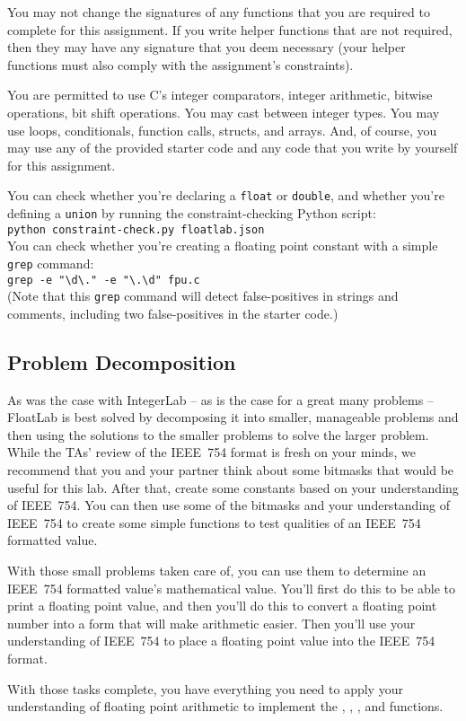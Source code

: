 You may not change the signatures of any functions that you are required to complete for this assignment.
If you write helper functions that are not required, then they may have any signature that you deem necessary
(your helper functions must also comply with the assignment's constraints).

You are permitted to use C's integer comparators, integer arithmetic, bitwise operations, bit shift operations.
You may cast between integer types.
You may use loops, conditionals, function calls, structs, and arrays.
And, of course, you may use any of the provided starter code and any code that you write by yourself for this assignment.

You can check whether you're declaring a \lstinline{float} or \lstinline{double}, and whether you're defining a \lstinline{union} by running the constraint-checking Python script: \\
\texttt{python constraint-check.py floatlab.json} \\
You can check whether you're creating a floating point constant with a simple \texttt{grep} command: \\
\verb#grep -e "\d\." -e "\.\d" fpu.c# \\
(Note that this \texttt{grep} command will detect false-positives in strings and comments, including two false-positives in the starter code.)

\subsection{Problem Decomposition}
As was the case with IntegerLab -- as is the case for a great many problems -- FloatLab is best solved by decomposing it into smaller, manageable problems and then using the solutions to the smaller problems to solve the larger problem.
While the TAs' review of the IEEE~754 format is fresh on your minds, we recommend that you and your partner think about some bitmasks that would be useful for this lab.
After that, create some constants based on your understanding of IEEE~754.
You can then use some of the bitmasks and your understanding of IEEE~754 to create some simple functions to test qualities of an IEEE~754 formatted value.

With those small problems taken care of, you can use them to determine an IEEE~754 formatted value's mathematical value.
You'll first do this to be able to print a floating point value, and then you'll do this to convert a floating point number into a form that will make arithmetic easier.
Then you'll use your understanding of IEEE~754 to place a floating point value into the IEEE~754 format.

With those tasks complete, you have everything you need to apply your understanding of floating point arithmetic to implement the , , , and  functions.
